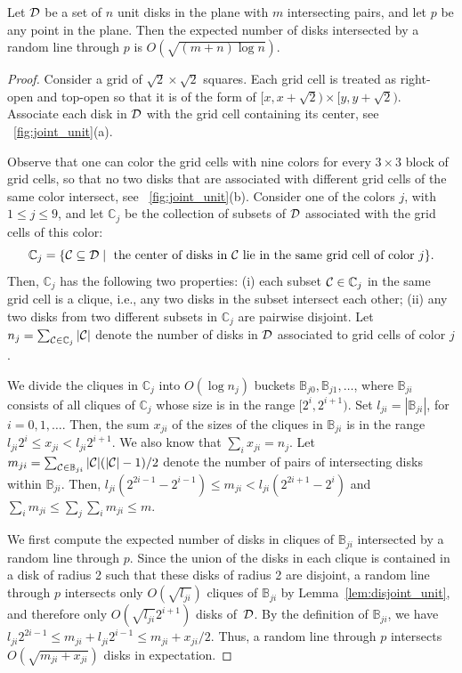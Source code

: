 \documentclass{llncs}
\begin{document}
\begin{lemma}\label{lem:joint_unit}
Let $\cal{D}$ be a set of $n$ unit disks in the plane with $m$ intersecting pairs, and let $p$ be any point in the plane.
Then the expected number of disks intersected by a random line through $p$ is $O(\sqrt{(m+n)\log n})$.
\end{lemma}
\begin{proof}
Consider a grid of $\sqrt{2} \times \sqrt{2}$ squares. Each grid cell is treated as right-open and top-open so that it is of the form of $[x,x+\sqrt{2})\times [y,y+\sqrt{2})$.
Associate each disk in $\cal{D}$ with the grid cell containing its center, see \figurename~\ref{fig:joint_unit}(a).

Observe that one can color the grid cells with nine colors for every $3\times 3$ block of grid cells, so that no two disks that are associated with different grid cells of the same color intersect, see \figurename~\ref{fig:joint_unit}(b). 
Consider one of the colors $j$, with $1 \le j \le 9$, and let ${\mathbb C}_j$ be the collection of subsets of $\cal{D}$ associated with the grid cells of this color:
\[
{\mathbb C}_j = \{{\cal C} \subseteq {\cal D} \mid \text{ the center of disks in } {\cal C} \text{ lie in the same grid cell of color } j\}.
\]
Then, ${\mathbb C}_j$ has the following two properties:
(i) each subset ${\cal C} \in {\mathbb C}_j$ in the same grid cell is a clique, i.e., any two disks in the subset intersect each other;
(ii) any two disks from two different subsets in ${\mathbb C}_j$ are pairwise disjoint.
Let $n_j = \sum_{{\cal C} \in {\mathbb C}_j} |{\cal C}|$ denote the number of
disks in ${\cal D}$ associated to grid cells of color $j$.

We divide the cliques in ${\mathbb C}_j$ into $O(\log n_j)$ buckets ${\mathbb B}_{j0},{\mathbb B}_{j1},\ldots$, where ${\mathbb B}_{ji}$ consists of all cliques of ${\mathbb C}_j$ whose size is in the range $[2^i,2^{i+1})$. Set $l_{ji} = |{\mathbb B}_{ji}|$, for $i=0,1,\ldots$.
Then, the sum $x_{ji}$ of the sizes of the cliques in ${\mathbb B}_{ji}$ is in the range $l_{ji}2^i \le x_{ji} < l_{ji}2^{i+1} $.
We also know that $\sum_i x_{ji} = n_j$.
Let 
$m_{ji} = \sum_{{\cal C} \in \mathbb{B}_{ji}} |{\cal C}|(|{\cal C}|-1)/2$
denote the number of pairs of intersecting disks within ${\mathbb B}_{ji}$.
Then, $l_{ji} (2^{2i-1}-2^{i-1}) \le m_{ji} < l_{ji} (2^{2i+1}-2^{i})$ and
$\sum_i m_{ji} \le \sum_j \sum_i m_{ji} \leq m.$

We first compute the expected number of disks in cliques of ${\mathbb B}_{ji}$ intersected by a random line through $p$. Since the union of the disks in each clique is contained in a disk of radius 2 such that these disks of radius 2 are disjoint, a random line through $p$ intersects only $O(\sqrt{l_{ji}})$ cliques of ${\mathbb B}_{ji}$ by Lemma~\ref{lem:disjoint_unit}, and therefore only $O(\sqrt{l_{ji}}2^{i+1})$ disks of~${\cal D}$. By the definition of ${\mathbb B}_{ji}$, we have $l_{ji}2^{2i-1} \leq m_{ji} + l_{ji} 2^{i-1} \leq m_{ji} + x_{ji}/2$. Thus, a random line through $p$ intersects $O(\sqrt{m_{ji} + x_{ji}})$ disks in expectation.


\end{proof}
\end{document}
